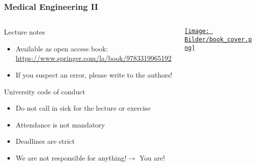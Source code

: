 \begin{frame}
	\frametitle{Medical Engineering II}
	\begin{columns}[c, onlytextwidth]
		\begin{column}{0.6\textwidth}
			\begin{block}{Lecture notes}
				\begin{itemize}
					\item Available as open access book: \url{https://www.springer.com/la/book/9783319965192}
					\item If you suspect an error, please write to the authors!
				\end{itemize}
			\end{block}
			\begin{block}{University code of conduct}
				\begin{itemize}
					\item Do not call in sick for the lecture or exercise
					\item Attendance is not mandatory
					\item Deadlines are strict
					\item We are not responsible for anything!\newline $\rightarrow$ You are!
				\end{itemize}
			\end{block}
		\end{column}\begin{column}{0.3\textwidth}
			\href{https://www.springer.com/la/book/9783319965192}{\texttt{[image: Bilder/book\_cover.png]}}
		\end{column}
	\end{columns}
\end{frame}

